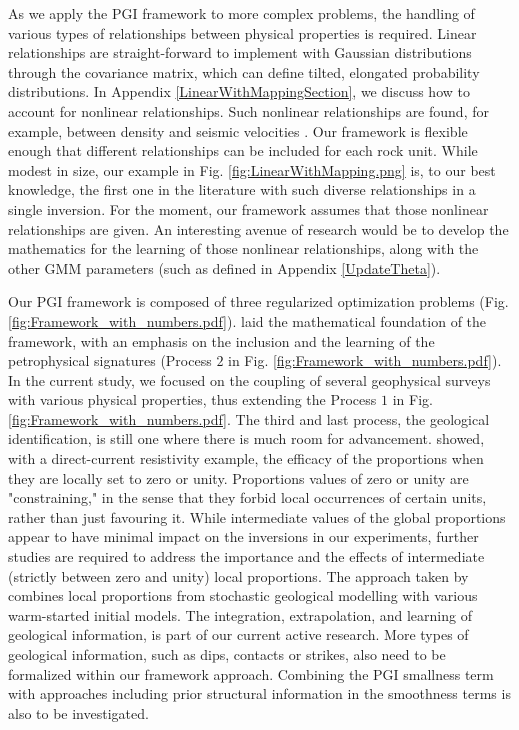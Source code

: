 \documentclass[extra, mreferee]{gji_joint} %
\begin{document}
As we apply the PGI framework to more complex problems, the handling of various types of relationships between physical properties is required. Linear relationships are straight-forward to implement with Gaussian distributions through the covariance matrix, which can define tilted, elongated probability distributions. In Appendix \ref{LinearWithMappingSection}, we discuss how to account for nonlinear relationships. Such nonlinear relationships are found, for example, between density and seismic velocities \citep{Onizawa2002}. Our framework is flexible enough that different relationships can be included for each rock unit. While modest in size, our example in Fig. \ref{fig:LinearWithMapping.png} is, to our best knowledge, the first one in the literature with such diverse relationships in a single inversion. For the moment, our framework assumes that those nonlinear relationships are given. An interesting avenue of research would be to develop the mathematics for the learning of those nonlinear relationships, along with the other GMM parameters (such as defined in Appendix \ref{UpdateTheta}).

Our PGI framework is composed of three regularized optimization problems (Fig. \ref{fig:Framework_with_numbers.pdf}). \citet{ggz389} laid the mathematical foundation of the framework, with an emphasis on the inclusion and the learning of the petrophysical signatures (Process $2$ in Fig. \ref{fig:Framework_with_numbers.pdf}). In the current study, we focused on the coupling of several geophysical surveys with various physical properties, thus extending the Process $1$ in Fig. \ref{fig:Framework_with_numbers.pdf}. The third and last process, the geological identification, is still one where there is much room for advancement. \citet{ggz389} showed, with a direct-current resistivity example, the efficacy of the proportions when they are locally set to zero or unity. Proportions values of zero or unity are "constraining," in the sense that they forbid local occurrences of certain units, rather than just favouring it.  While intermediate values of the global proportions appear to have minimal impact on the inversions in our experiments, further studies are required to address the importance and the effects of intermediate (strictly between zero and unity) local proportions. The approach taken by \citet{Giraud2017} combines local proportions from stochastic geological modelling with various warm-started initial models. The integration, extrapolation, and learning of geological information, is part of our current active research. More types of geological information, such as dips, contacts or strikes, also need to be formalized within our framework approach. Combining the PGI smallness term with approaches including prior structural information in the smoothness terms \citep{SparseNorms2, LelievreStructural, BrownStructural, YanStructural, GiraudStructural} is also to be investigated.
\end{document}
